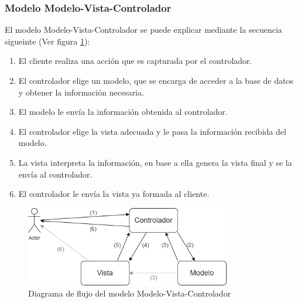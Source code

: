 \subsubsection{Modelo Modelo-Vista-Controlador}\label{diagrama_MVC}
El modelo Modelo-Vista-Controlador se puede explicar mediante la secuencia sigueinte (Ver figura \ref{fig:MVC}): 
\begin{enumerate}
    \item El cliente realiza una acción que es capturada por el controlador. 
    \item El controlador elige un modelo, que se encarga de acceder a la base de datos y obtener la información necesaria. 
    \item El modelo le envía la información obtenida al controlador. 
    \item El controlador elige la vista adecuada y le pasa la información recibida del modelo. 
    \item La vista interpreta la información, en base a ella genera la vista final y se la envía al controlador. 
    \item El controlador le envía la vista ya formada al cliente. 
\end{enumerate}

\begin{figure}[htb]
    \centering
    \includegraphics[width=0.8\textwidth]{imagenes/DiagramasFlujo/Modelo_Vista_Controlador.png}
\caption{Diagrama de flujo del modelo Modelo-Vista-Controlador}
\label{fig:MVC}
\end{figure}

